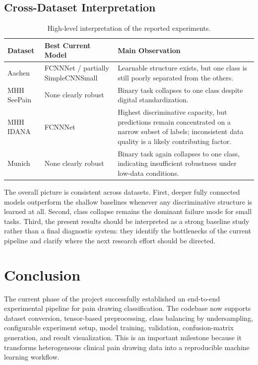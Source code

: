 \documentclass[12pt]{report}
\begin{document}
\section{Cross-Dataset Interpretation}

\begin{table}[H]
    \centering
    \begin{tabular}{|>{\raggedright\arraybackslash}p{3cm}|>{\raggedright\arraybackslash}p{2.6cm}|>{\raggedright\arraybackslash}p{7cm}|}
        \hline
        \textbf{Dataset} & \textbf{Best Current Model} & \textbf{Main Observation} \\
        \hline
        Aachen & FCNNNet / partially SimpleCNNSmall & Learnable structure exists, but one class is still poorly separated from the others. \\
        \hline
        MHH SeePain & None clearly robust & Binary task collapses to one class despite digital standardization. \\
        \hline
        MHH IDANA & FCNNNet & Highest discriminative capacity, but predictions remain concentrated on a narrow subset of labels; inconsistent data quality is a likely contributing factor. \\
        \hline
        Munich & None clearly robust & Binary task again collapses to one class, indicating insufficient robustness under low-data conditions. \\
        \hline
    \end{tabular}
    \caption{High-level interpretation of the reported experiments.}
    \label{tab:result_summary}
\end{table}

The overall picture is consistent across datasets. First, deeper fully connected models outperform the shallow baselines whenever any discriminative structure is learned at all. Second, class collapse remains the dominant failure mode for small tasks. Third, the present results should be interpreted as a strong baseline study rather than a final diagnostic system: they identify the bottlenecks of the current pipeline and clarify where the next research effort should be directed.

\chapter{Conclusion}

The current phase of the project successfully established an end-to-end experimental pipeline for pain drawing classification. The codebase now supports dataset conversion, tensor-based preprocessing, class balancing by undersampling, configurable experiment setup, model training, validation, confusion-matrix generation, and result visualization. This is an important milestone because it transforms heterogeneous clinical pain drawing data into a reproducible machine learning workflow.
\end{document}
